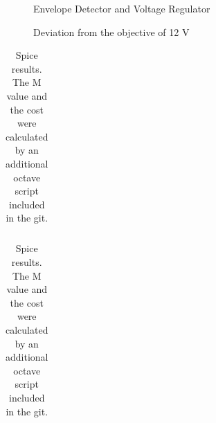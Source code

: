 \begin{figure}[H]
    \centering
{}
  \hfill
{}
\end{figure}

  \begin{figure}[H]
     \centering
     \caption{Envelope Detector and Voltage Regulator}
     \label{fig_2_reação_normal}
 \end{figure}


\begin{figure}[H]
    \centering
{}
  \hfill
{}
\end{figure}

  \begin{figure}[H]
     \centering
     \caption{Deviation from the objective of 12 V}
     \label{fig_2_reação_normal}
 \end{figure}


\begin{table}[h]
  \centering
  \begin{tabular}{|l|r|}
    \hline    
    
  \end{tabular}
  \caption{Spice results. The M value and the cost were calculated by an additional octave script included in the git.}
  \label{tab:info}
\end{table}

\begin{table}[h]
  \centering
  \begin{tabular}{|l|r|}
    \hline    
    
  \end{tabular}
  \caption{Spice results. The M value and the cost were calculated by an additional octave script included in the git.}
  \label{tab:info}
\end{table}


